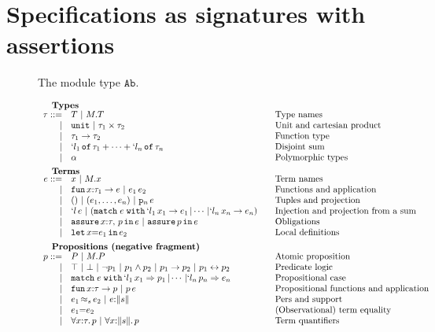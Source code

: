 \section{Specifications as signatures with assertions}
\label{sec:spec-sign-assert}

\iflong
\begin{figure}[t]
  \centering
  \caption{The module type $\mathtt{Ab}$.}
  \label{fig:module-example}
\end{figure}
\fi %

\iflong
\begin{figure}
  \[
  \begin{array}{rl@{\qquad}l}
    \noalign{\textbf{Types}}
    \oty ::= 
    & \oTY  \obar \oselect{\oM}{\oTY} &\mbox{Type names}\\
    | & \ounit \obar \oprod{\oty_1}{\oty_2} &\mbox{Unit and cartesian product}\\
    | & \oarrow{\oty_1}{\oty_2} & \mbox{Function type}\\
    | & \osumty{\ol_1}{\oty_1}{\ol_n}{\oty_n} &\mbox{Disjoint sum}\\
    | & \opty & \mbox{Polymorphic types}\\[5pt]
    
    \noalign{\textbf{Terms}}	
    \oe ::=
    & \ox \obar \oselect{\oM}{\ox} &\mbox{Term names}\\
    | & \olambda{\ox}{\oty_1}{\oe} \obar 
    \oapp{\oe_1}{\oe_2} &\mbox{Functions and application}\\
    | & ()
    \obar \otuple{\oe_1}{\oe_n} 
    \obar \oproj{\oe}{n}&\mbox{Tuples and projection}\\
    | & \oinj{\ol}{\oe} 
    \obar (\omatches{\oe}{\ol_1}{\ox_1}{\oe_1}{\ol_n}{\ox_n}{\oe_n})&\mbox{Injection and projection from a sum}\\
    | & \ooblig{\ox}{\oty}{\op}{\oe} \obar \oobligx{\op}{\oe} &\mbox{Obligations}\\
    | & \olet{\ox}{\oe_1}{\oe_2}&\mbox{Local definitions}\\[5pt]
    

    \noalign{\textbf{Propositions (negative fragment)}}
    \op ::= 
    & \oP \obar \oselect{\oM}{\oP}&\mbox{Atomic
      proposition}\\
    | & \otrue  \obar \ofalse \obar \onot{\op_1} \obar \oand{\op_1}{\op_2} \obar 
    \oimply{\op_1}{\op_2} \obar \oiff{\op_1}{\op_2} & \mbox{Predicate logic}\\ 
    | & \opcases{\oe}{\ol_1}{\ox_1}{\op_1}{\ol_n}{\op_n}{\oe_n}&\mbox{Propositional case}\\
    | & \olambda{\ox}{\oty}{\op}  \obar \oapp{\op}{\oe} &
    \mbox{Propositional functions and application}\\
    | & \oper{\os}{\oe_1}{\oe_2} \obar \ototal{\oe}{\os} & \mbox{Pers and support} \\
    | & \oequal{\oe_1}{\oe_2} & \mbox{(Observational) term equality}\\
    | & \oforall{\ox}{\oty}{\op}  \obar 
    \oforallt{\ox}{\os}{\op} & \mbox{Term quantifiers}\\[5pt]
    

\end{array}\]
\end{figure}
